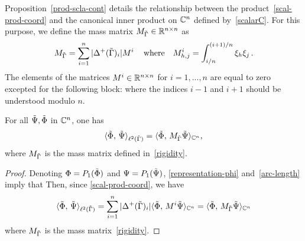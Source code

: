 Proposition~\eqref{prod-scla-cont} details the relationship between the product~\eqref{scal-prod-coord} and the canonical inner product on $\mathbb{C}^n$ defined by~\eqref{scalarC}. For this purpose, we define  the mass matrix $M_{\tilde{\Gamma}} \in \mathbb{R}^{n \times n}$  as
\begin{equation}\label{rigidity}
	M_{\tilde{\Gamma}} = \sum_{i=1}^n |\Delta^+(\tilde{\Gamma})_i| M^i\,
	\quad \text{where} \quad
	M^i_{h,j}=\int_{i/n}^{(i+1)/n}\xi_h\xi_j\,.
\end{equation} 
The elements of the matrices $M^i \in \mathbb{R}^{n \times n}$ for $i=1,...,n$ are equal to zero excepted for the following block:  
where the indices $i-1$ and $i+1$ should be understood modulo $n$. 
 
 
\begin{prop}\label{prod-scla-cont} For all $\tilde{\Psi}, \tilde{\Phi}$ in $\mathbb{C}^n$, one has
\begin{equation}\label{discreteprod}
 	\langle \tilde{\Phi},\,\tilde{\Psi}\rangle_{\ell^2(\tilde{\Gamma})}
	= 
	\langle \tilde{\Phi},\,M_{\tilde{\Gamma}}\tilde{\Psi}\rangle_{\mathbb{C}^n}, 
\end{equation}
where $M_{\tilde{\Gamma}}$ is the mass matrix defined in~\eqref{rigidity}.
\end{prop}

\begin{proof}  Denoting $\Phi=P_1(\tilde{\Phi})$ and $\Psi=P_1(\tilde{\Psi})$,
\eqref{representation-phi} and~\eqref{arc-length} imply that
Then, since \eqref{scal-prod-coord}, we have 
\begin{equation}
	\langle \tilde{\Phi},\,\tilde{\Psi}\rangle_{\ell^2(\tilde{\Gamma})} 
	= 
	\sum_{i=1}^n |\Delta^+( \tilde{\Gamma})_i| \langle \tilde{\Phi},\,M^i\tilde{\Psi}\rangle_{\mathbb{C}^n}
	= 
	\langle \tilde{\Phi},\,M_{\tilde{\Gamma}} \tilde{\Psi}\rangle_{\mathbb{C}^n}
\end{equation}
where $M_{\tilde{\Gamma}}$ is the  mass matrix~\eqref{rigidity}.
\end{proof}

